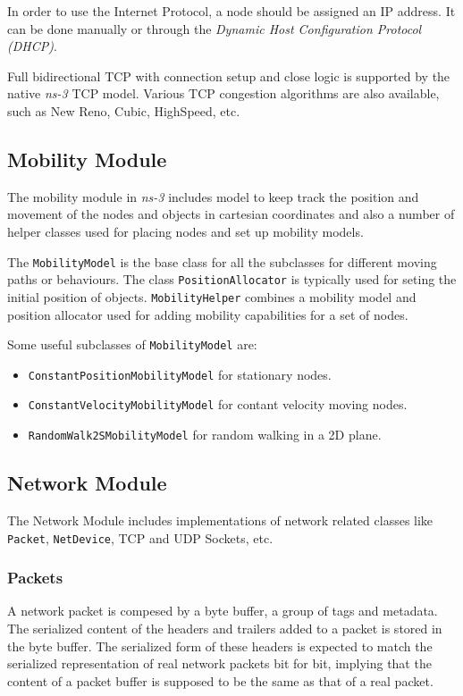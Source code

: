 In order to use the Internet Protocol, a node should be assigned an IP address. It can be done manually
or through the \textit{Dynamic Host Configuration Protocol (DHCP)}.

Full bidirectional TCP with connection setup and close logic is supported by the native \textit{ns-3} TCP model.
Various TCP congestion algorithms are also available, such as New Reno, Cubic, HighSpeed, etc.


\subsection{Mobility Module}
The mobility module in \textit{ns-3} includes model to keep track the position and movement of the nodes and objects 
in cartesian coordinates and also a number of helper classes used for placing nodes and set up mobility 
models.

The \texttt{MobilityModel} is the base class for all the subclasses for different moving paths or behaviours.
The class \texttt{PositionAllocator} is typically used for seting the initial position of objects. \texttt{MobilityHelper}
combines a mobility model and position allocator used for adding mobility capabilities for a set 
of nodes.

Some useful subclasses of \texttt{MobilityModel} are:
\begin{itemize}[noitemsep, topsep=0pt]
  \item \texttt{ConstantPositionMobilityModel} for stationary nodes.
  \item \texttt{ConstantVelocityMobilityModel} for contant velocity moving nodes.
  \item \texttt{RandomWalk2SMobilityModel} for random walking in a 2D plane.
\end{itemize}


\subsection{Network Module}
The Network Module includes implementations of network related classes like 
\texttt{Packet}, \texttt{NetDevice}, TCP and UDP Sockets, etc.

\subsubsection{Packets}
A network packet is compesed by a byte buffer, a group of tags and metadata.
The serialized content of the headers and trailers added to a packet is stored in the byte buffer. 
The serialized form of these headers is expected to match the serialized representation of real 
network packets bit for bit, implying that the content of a packet buffer is supposed to be the 
same as that of a real packet.

